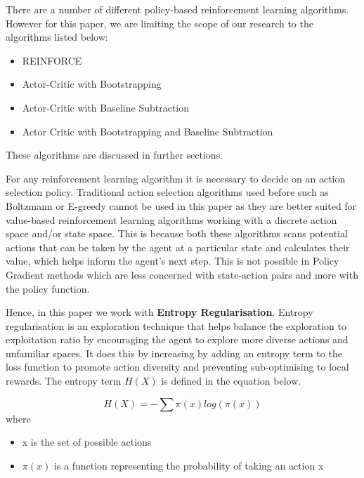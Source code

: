 \documentclass{article}
\begin{document}
\par
There are a number of different policy-based reinforcement learning algorithms. However for this paper, we are limiting the scope of our research to the algorithms listed below: 

\begin{itemize}[itemsep=0.0pt]
\item REINFORCE
\item Actor-Critic with Bootstrapping
\item Actor-Critic with Baseline Subtraction
\item Actor Critic with Bootstrapping and Baseline Subtraction
\end{itemize}
These algorithms are discussed in further sections. 

\par For any reinforcement learning algorithm it is necessary to decide on an action selection policy. Traditional action selection algorithms used before such as Boltzmann or E-greedy cannot be used in this paper as they are better suited for value-based reinforcement learning algorithms working with a discrete action space and/or state space. This is because both these algorithms scans potential actions that can be taken by the agent at a particular state and calculates their value, which helps inform the agent's next step. This is not possible in Policy Gradient methods which are less concerned with state-action pairs and more with the policy function. 
\par Hence, in this paper we work with \textbf{Entropy Regularisation}. Entropy regularisation is an exploration technique that helps balance the exploration to exploitation ratio by encouraging the agent to explore more diverse actions and unfamiliar spaces. It does this by increasing by adding an entropy term to the loss function to promote action diversity and preventing sub-optimising to local rewards. The entropy term $H(X)$ is defined in the equation below. %

\begin{equation*}
H(X) = - \sum \pi(x) log(\pi(x)) %
\end{equation*}
where
\begin{itemize}[itemsep=0.0pt]
\renewcommand\labelitemi{.}
\item x is the set of possible actions
\item $\pi(x)$ is a function representing the probability of taking an action x
\end{itemize}
\end{document}
